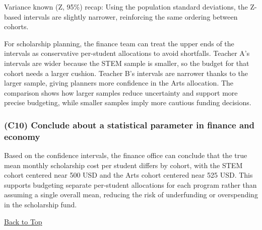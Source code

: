 Variance known (Z, 95\%) recap: Using the population standard deviations, the Z-based intervals are slightly narrower, reinforcing the same ordering between cohorts.

For scholarship planning, the finance team can treat the upper ends of the intervals as conservative per-student allocations to avoid shortfalls. Teacher A's intervals are wider because the STEM sample is smaller, so the budget for that cohort needs a larger cushion. Teacher B's intervals are narrower thanks to the larger sample, giving planners more confidence in the Arts allocation. The comparison shows how larger samples reduce uncertainty and support more precise budgeting, while smaller samples imply more cautious funding decisions.

\subsubsection{(C10) Conclude about a statistical parameter in finance and economy}\label{subsubsec:interval-example1-1-c10}

Based on the confidence intervals, the finance office can conclude that the true mean monthly scholarship cost per student differs by cohort, with the STEM cohort centered near 500 USD and the Arts cohort centered near 525 USD. This supports budgeting separate per-student allocations for each program rather than assuming a single overall mean, reducing the risk of underfunding or overspending in the scholarship fund.

\vspace{6pt}
\noindent\hyperref[table-of-contents]{Back to Top}

